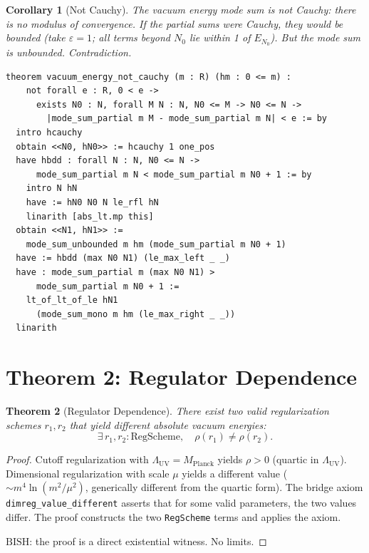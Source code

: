 \documentclass[11pt,a4paper]{article}
\theoremstyle{plain}
\newtheorem{theorem}{Theorem}[section]
\newtheorem{corollary}[theorem]{Corollary}
\theoremstyle{definition}
\newcommand{\BISH}{\ensuremath{\mathrm{BISH}}}
\newcommand{\MPl}{M_{\mathrm{Planck}}}
\begin{document}
\begin{corollary}[Not Cauchy]\label{cor:not-cauchy}
The vacuum energy mode sum is not Cauchy: there is no modulus of
convergence.  If the partial sums were Cauchy, they would be bounded
(take $\varepsilon = 1$; all terms beyond $N_0$ lie within 1 of
$E_{N_0}$).  But the mode sum is unbounded.  Contradiction.
\end{corollary}

\begin{lstlisting}[caption={Not Cauchy: \texttt{VacuumDivergence.lean}}]
theorem vacuum_energy_not_cauchy (m : R) (hm : 0 <= m) :
    not forall e : R, 0 < e ->
      exists N0 : N, forall M N : N, N0 <= M -> N0 <= N ->
        |mode_sum_partial m M - mode_sum_partial m N| < e := by
  intro hcauchy
  obtain <<N0, hN0>> := hcauchy 1 one_pos
  have hbdd : forall N : N, N0 <= N ->
      mode_sum_partial m N < mode_sum_partial m N0 + 1 := by
    intro N hN
    have := hN0 N0 N le_rfl hN
    linarith [abs_lt.mp this]
  obtain <<N1, hN1>> :=
    mode_sum_unbounded m hm (mode_sum_partial m N0 + 1)
  have := hbdd (max N0 N1) (le_max_left _ _)
  have : mode_sum_partial m (max N0 N1) >
      mode_sum_partial m N0 + 1 :=
    lt_of_lt_of_le hN1
      (mode_sum_mono m hm (le_max_right _ _))
  linarith
\end{lstlisting}

\section{Theorem 2: Regulator Dependence}\label{sec:regulator}

\begin{theorem}[Regulator Dependence]\label{thm:regulator}
There exist two valid regularization schemes $r_1, r_2$ that
yield different absolute vacuum energies:
\[
  \exists\, r_1, r_2 : \mathrm{RegScheme},\quad
  \rho(r_1) \neq \rho(r_2).
\]
\end{theorem}

\begin{proof}
Cutoff regularization with $\Lambda_{\mathrm{UV}} = \MPl$ yields
$\rho > 0$ (quartic in $\Lambda_{\mathrm{UV}}$).
Dimensional regularization with scale $\mu$ yields a different value
($\sim m^4\ln(m^2/\mu^2)$, generically different from the quartic form).
The bridge axiom \texttt{dimreg\_value\_different} asserts that
for some valid parameters, the two values differ.  The proof constructs
the two \texttt{RegScheme} terms and applies the axiom.

$\BISH$: the proof is a direct existential witness.  No limits.
\end{proof}
\end{document}
